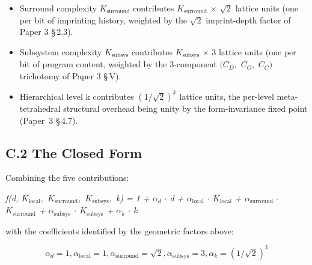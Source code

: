 \documentclass[11pt,oneside]{report}
\theoremstyle{definition}
\theoremstyle{remark}
\begin{document}
\begin{itemize}
\item
  Surround complexity \ensuremath{K_{\mathrm{surround}}} contributes \ensuremath{K_{\mathrm{surround}}} \ensuremath{\times} \ensuremath{\sqrt{2}} lattice
  units (one per bit of imprinting history, weighted by the \ensuremath{\sqrt{2}}
  imprint-depth factor of Paper 3 \S\,2.3).
\end{itemize}

\begin{itemize}
\item
  Subsystem complexity \ensuremath{K_{\mathrm{subsys}}} contributes \ensuremath{K_{\mathrm{subsys}}} \ensuremath{\times} 3 lattice units
  (one per bit of program content, weighted by the 3-component \ensuremath{(C_{D},}
  \ensuremath{C_{O},} \ensuremath{C_{C})} trichotomy of Paper 3 \S\,V).
\end{itemize}

\begin{itemize}
\item
  Hierarchical level k contributes \ensuremath{(1/\sqrt{2})^{k}} lattice units, the
  per-level meta-tetrahedral structural overhead being unity by the
  form-invariance fixed point (Paper~3 \S\,4.7).
\end{itemize}

\subsection*{C.2 The Closed Form}

Combining the five contributions:

\emph{f(d, \ensuremath{K_{\mathrm{local}},} \ensuremath{K_{\mathrm{surround}},} \ensuremath{K_{\mathrm{subsys}},} k) = 1 + \ensuremath{\alpha_{d}} \ensuremath{\cdot} d +
\ensuremath{\alpha_{\mathrm{local}}} \ensuremath{\cdot} \ensuremath{K_{\mathrm{local}}} + \ensuremath{\alpha_{\mathrm{surround}}} \ensuremath{\cdot} \ensuremath{K_{\mathrm{surround}}} + \ensuremath{\alpha_{\mathrm{subsys}}} \ensuremath{\cdot} \ensuremath{K_{\mathrm{subsys}}}
+ \ensuremath{\alpha_{k}} \ensuremath{\cdot} k}

with the coefficients identified by the geometric factors above:

\begin{equation*}
\alpha_{d} = 1, \alpha_{\mathrm{local}} = 1, \alpha_{\mathrm{surround}} = \sqrt{2}, \alpha_{\mathrm{subsys}} = 3, \alpha_{k} =
(1/\sqrt{2})^{k}
\end{equation*}
\end{document}
